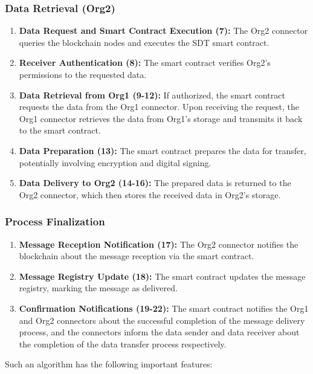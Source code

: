 \documentclass[10pt]{llncs}
\begin{document}
\subsubsection{Data Retrieval (Org2)}

\begin{enumerate}
    \item \textbf{Data Request and Smart Contract Execution (7):} The Org2 connector queries the blockchain nodes and executes the SDT smart contract.
    \item \textbf{Receiver Authentication (8):} The smart contract verifies Org2's permissions to the requested data.
    \item \textbf{Data Retrieval from Org1 (9-12):} If authorized, the smart contract requests the data from the Org1 connector.  
    Upon receiving the request, the Org1 connector retrieves the data from Org1's storage and transmits it back to the smart contract.
    \item \textbf{Data Preparation (13):} The smart contract prepares the data for transfer, potentially involving encryption and digital signing.
    \item \textbf{Data Delivery to Org2 (14-16):} The prepared data is returned to the Org2 connector, which then stores the received data in Org2's storage.
\end{enumerate}

\subsubsection{Process Finalization}

\begin{enumerate}
    \item \textbf{Message Reception Notification (17):} The Org2 connector notifies the blockchain about the message reception via the smart contract.
    \item \textbf{Message Registry Update (18):} The smart contract updates the message registry, marking the message as delivered.
    \item \textbf{Confirmation Notifications (19-22):} The smart contract notifies the Org1 and Org2 connectors about the successful completion of the message delivery process, 
    and the connectors inform the data sender and data receiver about the completion of the data transfer process respectively.
\end{enumerate}

Such an algorithm has the following important features:
\end{document}
